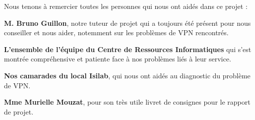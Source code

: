 Nous tenons à remercier toutes les personnes qui nous ont aidés dans ce projet :

\vspace{10pt}
\textbf{M. Bruno Guillon}, notre tuteur de projet qui a toujours été présent pour nous conseiller et nous aider, notemment sur les problèmes de VPN
rencontrés.

\vspace{10pt}
\textbf{L'ensemble de l'équipe du Centre de Ressources Informatiques} qui s'est montrée compréhensive et patiente face à nos problèmes liés à leur
service.

\vspace{10pt}
\textbf{Nos camarades du local Isilab}, qui nous ont aidés au diagnostic du problème de VPN.

\vspace{10pt}
\textbf{Mme Murielle Mouzat}, pour son très utile livret de consignes pour le rapport de projet.